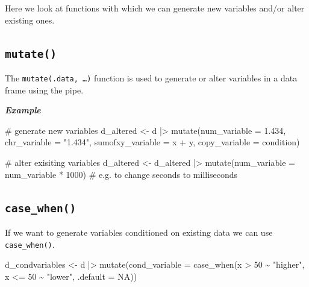 \documentclass[
  letterpaper,
  DIV=11,
  numbers=noendperiod]{scrreprt}
\newenvironment{Shaded}{\begin{snugshade}}{\end{snugshade}}
\newcommand{\AttributeTok}[1]{\textcolor[rgb]{0.40,0.45,0.13}{#1}}
\newcommand{\CommentTok}[1]{\textcolor[rgb]{0.37,0.37,0.37}{#1}}
\newcommand{\ConstantTok}[1]{\textcolor[rgb]{0.56,0.35,0.01}{#1}}
\newcommand{\DecValTok}[1]{\textcolor[rgb]{0.68,0.00,0.00}{#1}}
\newcommand{\FloatTok}[1]{\textcolor[rgb]{0.68,0.00,0.00}{#1}}
\newcommand{\FunctionTok}[1]{\textcolor[rgb]{0.28,0.35,0.67}{#1}}
\newcommand{\NormalTok}[1]{\textcolor[rgb]{0.00,0.23,0.31}{#1}}
\newcommand{\OtherTok}[1]{\textcolor[rgb]{0.00,0.23,0.31}{#1}}
\newcommand{\SpecialCharTok}[1]{\textcolor[rgb]{0.37,0.37,0.37}{#1}}
\newcommand{\StringTok}[1]{\textcolor[rgb]{0.13,0.47,0.30}{#1}}
\begin{document}
Here we look at functions with which we can generate new variables
and/or alter existing ones.

\hypertarget{mutate}{%
\subsection{\texorpdfstring{\texttt{mutate()}}{mutate()}}\label{mutate}}

The \texttt{mutate(.data,\ …)} function is used to generate or alter
variables in a data frame using the pipe.

\textbf{\emph{Example}}

\begin{Shaded}
\begin{Highlighting}[]
\CommentTok{\# generate new variables}
\NormalTok{d\_altered }\OtherTok{\textless{}{-}}\NormalTok{ d }\SpecialCharTok{|\textgreater{}}
    \FunctionTok{mutate}\NormalTok{(}\AttributeTok{num\_variable =} \FloatTok{1.434}\NormalTok{,}
           \AttributeTok{chr\_variable =} \StringTok{"1.434"}\NormalTok{,}
           \AttributeTok{sumofxy\_variable =}\NormalTok{ x }\SpecialCharTok{+}\NormalTok{ y,}
           \AttributeTok{copy\_variable =}\NormalTok{ condition)}

\CommentTok{\# alter exisiting variables}
\NormalTok{d\_altered }\OtherTok{\textless{}{-}}\NormalTok{ d\_altered }\SpecialCharTok{|\textgreater{}}
    \FunctionTok{mutate}\NormalTok{(}\AttributeTok{num\_variable =}\NormalTok{ num\_variable }\SpecialCharTok{*} \DecValTok{1000}\NormalTok{) }\CommentTok{\# e.g. to change seconds to milliseconds}
\end{Highlighting}
\end{Shaded}

\hypertarget{case_when}{%
\subsection{\texorpdfstring{\texttt{case\_when()}}{case\_when()}}\label{case_when}}

If we want to generate variables conditioned on existing data we can use
\texttt{case\_when()}.

\begin{Shaded}
\begin{Highlighting}[]
\NormalTok{d\_condvariables }\OtherTok{\textless{}{-}}\NormalTok{ d }\SpecialCharTok{|\textgreater{}}
    \FunctionTok{mutate}\NormalTok{(}\AttributeTok{cond\_variable =} \FunctionTok{case\_when}\NormalTok{(x }\SpecialCharTok{\textgreater{}} \DecValTok{50} \SpecialCharTok{\textasciitilde{}} \StringTok{"higher"}\NormalTok{,}
\NormalTok{                                     x }\SpecialCharTok{\textless{}=} \DecValTok{50} \SpecialCharTok{\textasciitilde{}} \StringTok{"lower"}\NormalTok{,}
                                     \AttributeTok{.default =} \ConstantTok{NA}\NormalTok{))}
\end{Highlighting}
\end{Shaded}
\end{document}
